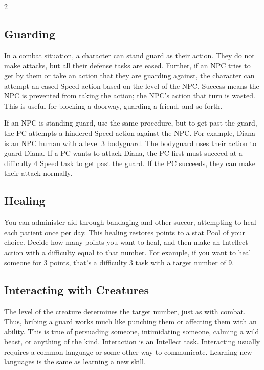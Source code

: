 \begin{multicols}{2}

\subsection{Guarding}

In a combat situation, a character can stand guard as their action. They do not make attacks, but all their defense tasks are eased. Further, if an NPC tries to get by them or take an action that they are guarding against, the character can attempt an eased Speed action based on the level of the NPC. Success means the NPC is prevented from taking the action; the NPC’s action that turn is wasted. This is useful for blocking a doorway, guarding a friend, and so forth.

If an NPC is standing guard, use the same procedure, but to get past the guard, the PC attempts a hindered Speed action against the NPC. For example, Diana is an NPC human with a level 3 bodyguard. The bodyguard uses their action to guard Diana. If a PC wants to attack Diana, the PC first must succeed at a difficulty 4 Speed task to get past the guard. If the PC succeeds, they can make their attack normally.

\subsection{Healing}

You can administer aid through bandaging and other succor, attempting to heal each patient once per day. This healing restores points to a stat Pool of your choice. Decide how many points you want to heal, and then make an Intellect action with a difficulty equal to that number. For example, if you want to heal someone for 3 points, that’s a difficulty 3 task with a target number of 9. 

\subsection{Interacting with Creatures}

The level of the creature determines the target number, just as with combat. Thus, bribing a guard works much like punching them or affecting them with an ability. This is true of persuading someone, intimidating someone, calming a wild beast, or anything of the kind. Interaction is an Intellect task. Interacting usually requires a common language or some other way to communicate. Learning new languages is the same as learning a new skill.


\end{multicols}
